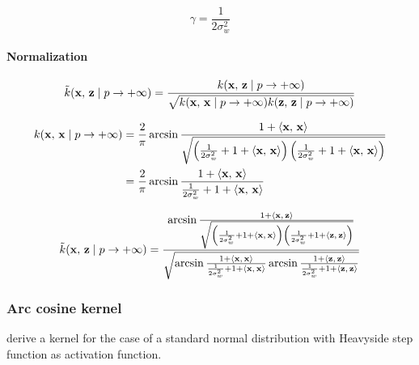 \begin{equation}
	\gamma = \frac{1}{2\sigma_w^2}
\end{equation}

\paragraph{Normalization}

\begin{equation}\label{eq:normalized}
	\tilde{k}(\mathbf{x},\,\mathbf{z} \mid p \to + \infty) = \frac{
		k(\mathbf{x},\,\mathbf{z} \mid p \to + \infty) }{
		\sqrt{
			k(\mathbf{x},\,\mathbf{x} \mid p \to + \infty)
			k(\mathbf{z},\,\mathbf{z} \mid p \to + \infty)
		}
	}
\end{equation}

\begin{align*}\label{eq:kernel_asin_xx}
	k(\mathbf{x},\,\mathbf{x} \mid p \to + \infty)
	 & = \frac{2}{\pi}
	\arcsin \frac{1 + \left\langle \mathbf{x},\,\mathbf{x} \right\rangle}{\sqrt{
			\left(
			\frac{1}{2\sigma_w^2} + 1 + \left\langle \mathbf{x},\,\mathbf{x} \right\rangle
			\right)
			\left(
			\frac{1}{2\sigma_w^2} + 1 + \left\langle \mathbf{x},\,\mathbf{x} \right\rangle
			\right)
	}}                 \\
	 & = \frac{2}{\pi}
	\arcsin \frac{1 + \left\langle \mathbf{x},\,\mathbf{x} \right\rangle}{
		\frac{1}{2\sigma_w^2} + 1 + \left\langle \mathbf{x},\,\mathbf{x} \right\rangle
	}                  \\
\end{align*}

\begin{equation}
	\tilde{k}(\mathbf{x},\,\mathbf{z} \mid p \to + \infty) =
	\frac{
		\arcsin \frac{1 + \left\langle \mathbf{x},\,\mathbf{z} \right\rangle}{\sqrt{
				\left(
				\frac{1}{2\sigma_w^2} + 1 + \left\langle \mathbf{x},\,\mathbf{x} \right\rangle
				\right)
				\left(
				\frac{1}{2\sigma_w^2} + 1 + \left\langle \mathbf{z},\,\mathbf{z} \right\rangle
				\right)
			}}
	}{
		\sqrt{
			\arcsin \frac{1 + \left\langle \mathbf{x},\,\mathbf{x} \right\rangle}{
				\frac{1}{2\sigma_w^2} + 1 + \left\langle \mathbf{x},\,\mathbf{x} \right\rangle
			}
			\arcsin \frac{1 + \left\langle \mathbf{z},\,\mathbf{z} \right\rangle}{
				\frac{1}{2\sigma_w^2} + 1 + \left\langle \mathbf{z},\,\mathbf{z} \right\rangle
			}
		}
	}
\end{equation}

\subsubsection{Arc cosine kernel}

\Textcite{choLargemarginClassificationInfinite2010} derive a kernel for the case of a standard normal
distribution with Heavyside step function as activation function.

